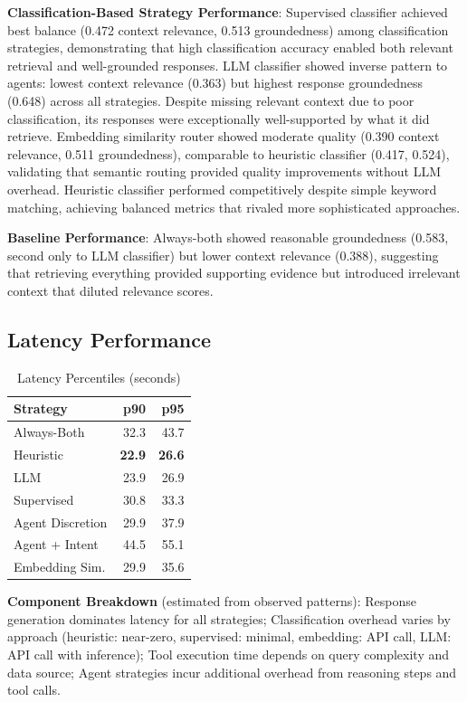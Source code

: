 \documentclass[twocolumn,10pt]{article}
\begin{document}
\textbf{Classification-Based Strategy Performance}: Supervised classifier achieved best balance (0.472 context relevance, 0.513 groundedness) among classification strategies, demonstrating that high classification accuracy enabled both relevant retrieval and well-grounded responses. LLM classifier showed inverse pattern to agents: lowest context relevance (0.363) but highest response groundedness (0.648) across all strategies. Despite missing relevant context due to poor classification, its responses were exceptionally well-supported by what it did retrieve. Embedding similarity router showed moderate quality (0.390 context relevance, 0.511 groundedness), comparable to heuristic classifier (0.417, 0.524), validating that semantic routing provided quality improvements without LLM overhead. Heuristic classifier performed competitively despite simple keyword matching, achieving balanced metrics that rivaled more sophisticated approaches.

\textbf{Baseline Performance}: Always-both showed reasonable groundedness (0.583, second only to LLM classifier) but lower context relevance (0.388), suggesting that retrieving everything provided supporting evidence but introduced irrelevant context that diluted relevance scores.

\subsection{Latency Performance}

\begin{table}[h]
\centering
\caption{Latency Percentiles (seconds)}
\small
\begin{tabular}{lrr}
\toprule
Strategy & p90 & p95 \\
\midrule
Always-Both & 32.3 & 43.7 \\
Heuristic & \textbf{22.9} & \textbf{26.6} \\
LLM & 23.9 & 26.9 \\
Supervised & 30.8 & 33.3 \\
Agent Discretion & 29.9 & 37.9 \\
Agent + Intent & 44.5 & 55.1 \\
Embedding Sim. & 29.9 & 35.6 \\
\bottomrule
\end{tabular}
\end{table}

\textbf{Component Breakdown} (estimated from observed patterns): Response generation dominates latency for all strategies; Classification overhead varies by approach (heuristic: near-zero, supervised: minimal, embedding: API call, LLM: API call with inference); Tool execution time depends on query complexity and data source; Agent strategies incur additional overhead from reasoning steps and tool calls.
\end{document}
